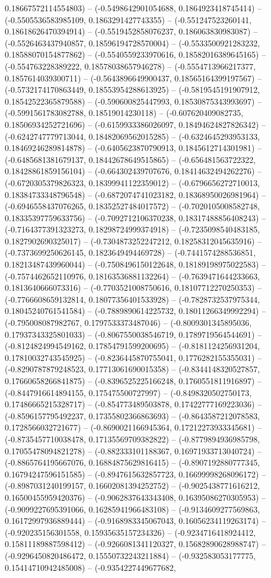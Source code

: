 0.18667572114554803) -- (-0.5498642901054688, 0.1864923418745414) -- (-0.5505536583985109, 0.1863291427743355) -- (-0.551247523260141, 0.18618626470394914) -- (-0.5519452858076237, 0.186063830983087) -- (-0.5526463437940857, 0.18596194728570004) -- (-0.5533500921283232, 0.18588070154877862) -- (-0.5540559233970616, 0.18582016389645165) -- (-0.554763228389222, 0.18578038657946278) -- (-0.5554713966217377, 0.1857614039300711) -- (-0.5643896649900437, 0.18565164399197567) -- (-0.5732174170863449, 0.18553954288613925) -- (-0.5819545191907912, 0.18542522365879588) -- (-0.590600825447993, 0.18530875343993697) -- (-0.5991561783082788, 0.18519014230118) -- (-0.607620409082735, 0.18506934252721696) -- (-0.6159933386026097, 0.18494624827826342) -- (-0.6242747779713044, 0.18482069562015285) -- (-0.6324645293953133, 0.18469246289814878) -- (-0.6405623870790913, 0.1845612714301981) -- (-0.6485681381679137, 0.18442678649515865) -- (-0.656481563722322, 0.18428861859156104) -- (-0.664302439707676, 0.18414632494262276) -- (-0.6720305379826323, 0.18399941122359012) -- (-0.6796656272710013, 0.18384733348796548) -- (-0.6872074741023182, 0.18368950026981964) -- (-0.6946558437076265, 0.18352527484017572) -- (-0.7020105008582748, 0.18335397759633756) -- (-0.7092712106370238, 0.18317488856408243) -- (-0.7164377391323273, 0.18298724999374918) -- (-0.7235098540483185, 0.1827902690325017) -- (-0.7304873252247212, 0.18258312045635916) -- (-0.7373699250626145, 0.1823649494469728) -- (-0.7441574288536851, 0.18213487439960044) -- (-0.7508496150122648, 0.18189198975022583) -- (-0.7574462652110976, 0.18163536881132264) -- (-0.7639471644233663, 0.1813640666073316) -- (-0.7703521008750616, 0.18107712270250353) -- (-0.7766608659132814, 0.18077356401533928) -- (-0.7828732537975344, 0.18045240761541584) -- (-0.7889890614225732, 0.18011266349992294) -- (-0.795008087982767, 0.1797533373487046) -- (-0.8009301345895036, 0.17937343325801033) -- (-0.8067550038546719, 0.1789719564544691) -- (-0.8124824994549162, 0.17854791599200695) -- (-0.8181124256931204, 0.17810032743545925) -- (-0.8236445870755041, 0.1776282155355031) -- (-0.8290787879248523, 0.17713061690015358) -- (-0.8344148320527857, 0.17660658266841875) -- (-0.8396525225166248, 0.1760551811916897) -- (-0.8447916614894155, 0.175475500727997) -- (-0.8498320502750173, 0.17486665215328717) -- (-0.854773489503878, 0.17422777169223036) -- (-0.8596157795492237, 0.17355802366863693) -- (-0.8643587212078583, 0.1728566032721677) -- (-0.8690021166945364, 0.17212273933345681) -- (-0.8735457710038478, 0.17135569709382822) -- (-0.8779894936985798, 0.17055478094821278) -- (-0.882333101188367, 0.16971933713040724) -- (-0.8865764195667076, 0.16884875629816415) -- (-0.8907192880777345, 0.16794247596151585) -- (-0.8947615632857723, 0.16699998268096172) -- (-0.8987031240199157, 0.16602081394252752) -- (-0.9025438771616212, 0.16500455959420376) -- (-0.9062837643343408, 0.16395086270305953) -- (-0.9099227695391066, 0.16285941966483108) -- (-0.9134609277569863, 0.16172997936889444) -- (-0.9168983345067043, 0.16056234119263174) -- (-0.920235156301558, 0.15935635157234326) -- (-0.9234716418924412, 0.15811189887598412) -- (-0.9266081341120327, 0.15682890628988747) -- (-0.9296450820486472, 0.15550732243211884) -- (-0.932583053177775, 0.15414710942485008) -- (-0.9354227449677682, 